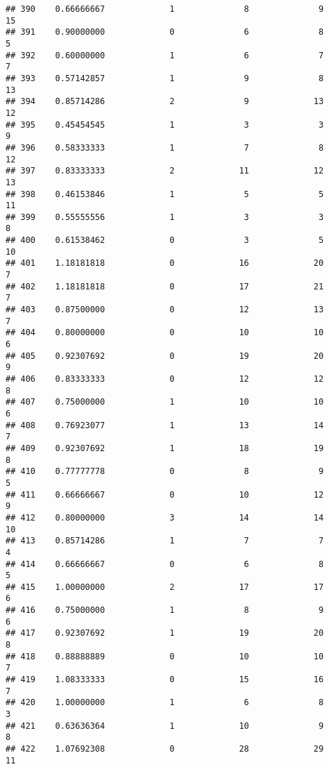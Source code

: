 \documentclass[
]{article}
\begin{document}
\begin{verbatim}
## 390    0.66666667             1              8              9             15
## 391    0.90000000             0              6              8              5
## 392    0.60000000             1              6              7              7
## 393    0.57142857             1              9              8             13
## 394    0.85714286             2              9             13             12
## 395    0.45454545             1              3              3              9
## 396    0.58333333             1              7              8             12
## 397    0.83333333             2             11             12             13
## 398    0.46153846             1              5              5             11
## 399    0.55555556             1              3              3              8
## 400    0.61538462             0              3              5             10
## 401    1.18181818             0             16             20              7
## 402    1.18181818             0             17             21              7
## 403    0.87500000             0             12             13              7
## 404    0.80000000             0             10             10              6
## 405    0.92307692             0             19             20              9
## 406    0.83333333             0             12             12              8
## 407    0.75000000             1             10             10              6
## 408    0.76923077             1             13             14              7
## 409    0.92307692             1             18             19              8
## 410    0.77777778             0              8              9              5
## 411    0.66666667             0             10             12              9
## 412    0.80000000             3             14             14             10
## 413    0.85714286             1              7              7              4
## 414    0.66666667             0              6              8              5
## 415    1.00000000             2             17             17              6
## 416    0.75000000             1              8              9              6
## 417    0.92307692             1             19             20              8
## 418    0.88888889             0             10             10              7
## 419    1.08333333             0             15             16              7
## 420    1.00000000             1              6              8              3
## 421    0.63636364             1             10              9              8
## 422    1.07692308             0             28             29             11

\end{verbatim}
\end{document}

